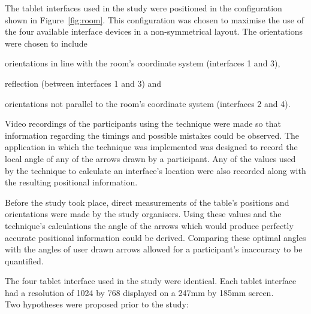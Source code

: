 \documentclass{bmcart}
\begin{document}
The tablet interfaces used in the study were positioned in the configuration shown in Figure~\ref{fig:room}.
This configuration was chosen to maximise the use of the four available interface devices in a non-symmetrical layout.
The orientations were chosen to include 
\begin{inparaenum}[(i)] 
\item orientations in line with the room's coordinate system (interfaces 1 and 3), 
\item reflection (between interfaces 1 and 3) and 
\item orientations not parallel to the room's coordinate system (interfaces 2 and 4).
\end{inparaenum}

Video recordings of the participants using the technique were made so that information regarding the timings and possible mistakes could be observed.
The application in which the technique was implemented was designed to record the local angle of any of the arrows drawn by a participant.
Any of the values used by the technique to calculate an interface's location were also recorded along with the resulting positional information.

Before the study took place, direct measurements of the table's positions and orientations were made by the study organisers.
Using these values and the technique's calculations the angle of the arrows which would produce perfectly accurate positional information could be derived.
Comparing these optimal angles with the angles of user drawn arrows allowed for a participant's inaccuracy to be quantified.

The four tablet interface used in the study were identical.
Each tablet interface had a resolution of 1024 by 768 displayed on a 247mm by 185mm screen.\\

\noindent Two hypotheses were proposed prior to the study:\\
\end{document}
